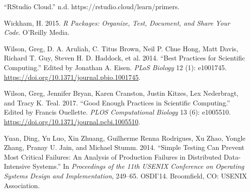 \documentclass[
]{article}
\newlength{\cslhangindent}
\newenvironment{cslreferences}%
  {\setlength{\parindent}{0pt}%
  \everypar{\setlength{\hangindent}{\cslhangindent}}\ignorespaces}%
  {\par}
\begin{document}
\begin{cslreferences}
\leavevmode\hypertarget{ref-_rstudiocloud_}{}%
``RStudio Cloud.'' n.d. https://rstudio.cloud/learn/primers.

\leavevmode\hypertarget{ref-wickham_r_2015}{}%
Wickham, H. 2015. \emph{R Packages: Organize, Test, Document, and Share
Your Code}. O'Reilly Media.

\leavevmode\hypertarget{ref-wilson_best_2014}{}%
Wilson, Greg, D. A. Aruliah, C. Titus Brown, Neil P. Chue Hong, Matt
Davis, Richard T. Guy, Steven H. D. Haddock, et al. 2014. ``Best
Practices for Scientific Computing.'' Edited by Jonathan A. Eisen.
\emph{PLoS Biology} 12 (1): e1001745.
\url{https://doi.org/10.1371/journal.pbio.1001745}.

\leavevmode\hypertarget{ref-wilson_good_2017}{}%
Wilson, Greg, Jennifer Bryan, Karen Cranston, Justin Kitzes, Lex
Nederbragt, and Tracy K. Teal. 2017. ``Good Enough Practices in
Scientific Computing.'' Edited by Francis Ouellette. \emph{PLOS
Computational Biology} 13 (6): e1005510.
\url{https://doi.org/10.1371/journal.pcbi.1005510}.

\leavevmode\hypertarget{ref-yuan_simpletestingcan_2014}{}%
Yuan, Ding, Yu Luo, Xin Zhuang, Guilherme Renna Rodrigues, Xu Zhao,
Yongle Zhang, Pranay U. Jain, and Michael Stumm. 2014. ``Simple Testing
Can Prevent Most Critical Failures: An Analysis of Production Failures
in Distributed Data-Intensive Systems.'' In \emph{Proceedings of the
11th USENIX Conference on Operating Systems Design and Implementation},
249--65. OSDI'14. Broomfield, CO: USENIX Association.
\end{cslreferences}
\end{document}
